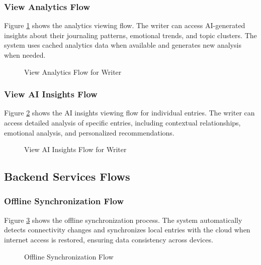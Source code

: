 \subsubsection{View Analytics Flow}\label{subsubsec:analyticsFlow}

Figure \ref{fig:analytics-flow} shows the analytics viewing flow. The writer can access AI-generated insights about their journaling patterns, emotional trends, and topic clusters. The system uses cached analytics data when available and generates new analysis when needed.

\begin{figure}[H]
\centering

\caption{View Analytics Flow for Writer}
\label{fig:analytics-flow}
\end{figure}

\subsubsection{View AI Insights Flow}\label{subsubsec:insightsFlow}

Figure \ref{fig:insights-flow} shows the AI insights viewing flow for individual entries. The writer can access detailed analysis of specific entries, including contextual relationships, emotional analysis, and personalized recommendations.

\begin{figure}[H]
\centering

\caption{View AI Insights Flow for Writer}
\label{fig:insights-flow}
\end{figure}

\subsection{Backend Services Flows}\label{subsec:backendFlows}

\subsubsection{Offline Synchronization Flow}\label{subsubsec:syncFlow}

Figure \ref{fig:sync-flow} shows the offline synchronization process. The system automatically detects connectivity changes and synchronizes local entries with the cloud when internet access is restored, ensuring data consistency across devices.

\begin{figure}[H]
\centering

\caption{Offline Synchronization Flow}
\label{fig:sync-flow}
\end{figure}

